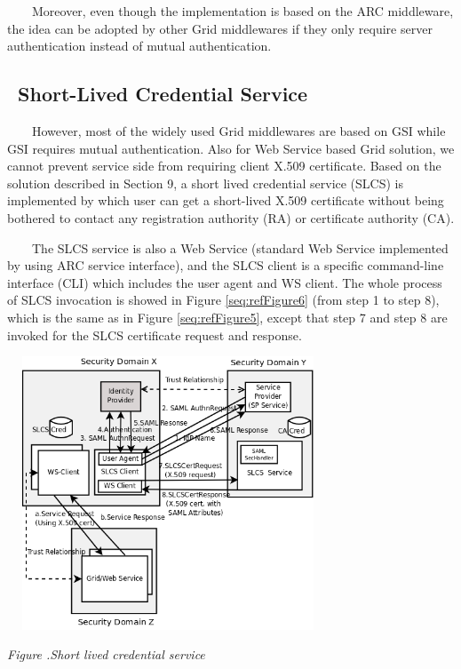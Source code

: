 \documentclass[a4paper]{article}
\newcounter{Figure}
\renewcommand\theFigure{\arabic{Figure}}
\begin{document}
{\upshape\color{black}
\ \ \ \ Moreover, even though the implementation is based on the ARC
middleware, the idea can be adopted by other Grid middlewares if they
only require server authentication instead of mutual authentication.}


\bigskip

\subsection[\ Short{}-Lived Credential
Service]{\foreignlanguage{english}{\ }Short-Lived Credential Service}
{\color{black}
\ \ \ \ However, most of the widely used Grid middlewares are based on
GSI while GSI requires mutual authentication. Also for Web Service
based Grid solution, we cannot prevent service side from requiring
client X.509 certificate. Based on the solution described in Section 9,
a short lived credential service (SLCS) is implemented by which user
can get a short-lived X.509 certificate without being bothered to
contact any registration authority (RA) or certificate authority (CA).}

{\color{black}
\ \ \ \ The SLCS service is also a Web Service (standard Web Service
implemented by using ARC service interface), and the SLCS client is a
specific command-line interface (CLI) which includes the user agent and
WS client. The whole process of SLCS invocation is showed in Figure
\ref{seq:refFigure6} (from step 1 to step 8), which is the same as in
Figure \ref{seq:refFigure5}, except that step 7 and step 8 are invoked
for the SLCS certificate request and response.}



\begin{center}
\includegraphics[width=3.7689in,height=3.2055in]{SecurityFrameworkofARC1-img8.png}
\end{center}
{\centering{}\itshape\color{black}
Figure {\theFigure\label{seq:refFigure6}}.Short
lived credential service
\par}
\end{document}

